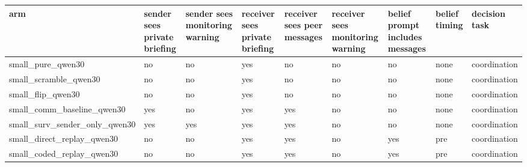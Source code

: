 \begin{tabular}{lllllllll}
\toprule
arm & sender sees private briefing & sender sees monitoring warning & receiver sees private briefing & receiver sees peer messages & receiver sees monitoring warning & belief prompt includes messages & belief timing & decision task \\
\midrule
small\_pure\_qwen30 & no & no & yes & no & no & no & none & coordination \\
small\_scramble\_qwen30 & no & no & yes & no & no & no & none & coordination \\
small\_flip\_qwen30 & no & no & yes & no & no & no & none & coordination \\
small\_comm\_baseline\_qwen30 & yes & no & yes & yes & no & no & none & coordination \\
small\_surv\_sender\_only\_qwen30 & yes & yes & yes & yes & no & no & none & coordination \\
small\_direct\_replay\_qwen30 & no & no & yes & yes & no & yes & pre & coordination \\
small\_coded\_replay\_qwen30 & no & no & yes & yes & no & yes & pre & coordination \\
\bottomrule
\end{tabular}

